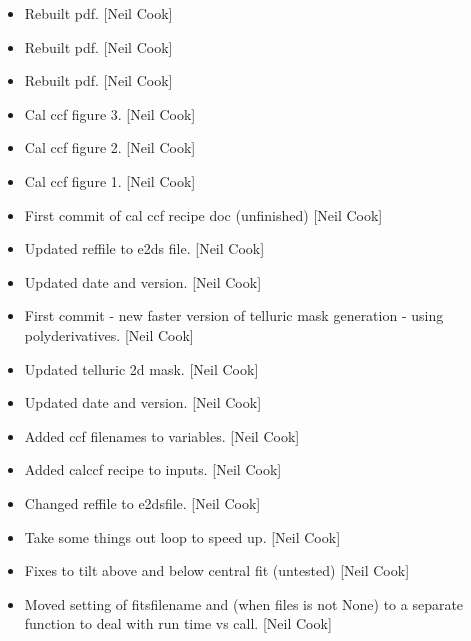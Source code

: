\documentclass[a4paper,10pt,english]{report}
\begin{document}
\label{\detokenize{misc/changelog:id479}}\begin{itemize}
\item {} 
Rebuilt pdf. {[}Neil Cook{]}

\item {} 
Rebuilt pdf. {[}Neil Cook{]}

\item {} 
Rebuilt pdf. {[}Neil Cook{]}

\item {} 
Cal ccf figure 3. {[}Neil Cook{]}

\item {} 
Cal ccf figure 2. {[}Neil Cook{]}

\item {} 
Cal ccf figure 1. {[}Neil Cook{]}

\item {} 
First commit of cal ccf recipe doc (unfinished) {[}Neil Cook{]}

\item {} 
Updated reffile to e2ds file. {[}Neil Cook{]}

\item {} 
Updated date and version. {[}Neil Cook{]}

\item {} 
First commit - new faster version of telluric mask generation - using
polyderivatives. {[}Neil Cook{]}

\item {} 
Updated telluric 2d mask. {[}Neil Cook{]}

\item {} 
Updated date and version. {[}Neil Cook{]}

\item {} 
Added ccf filenames to variables. {[}Neil Cook{]}

\item {} 
Added calccf recipe to inputs. {[}Neil Cook{]}

\item {} 
Changed reffile to e2dsfile. {[}Neil Cook{]}

\item {} 
Take some things out loop to speed up. {[}Neil Cook{]}

\item {} 
Fixes to tilt above and below central fit (untested) {[}Neil Cook{]}

\item {} 
Moved setting of fitsfilename and  (when files is not
None) to a separate function to deal with run time vs call. {[}Neil
Cook{]}


\end{itemize}
\end{document}
